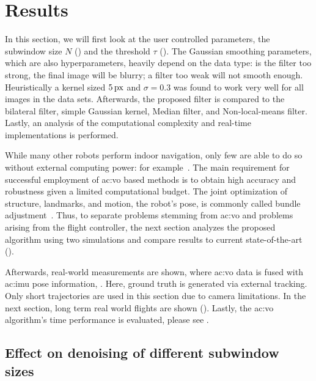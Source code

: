 \section{Results}
\label{perception_results}

In this section, we will first look at the user controlled parameters, the subwindow size $N$ () and the threshold $\tau$ ().
The Gaussian smoothing parameters, which are also hyperparameters, heavily depend on the data type: is the filter too strong, the final image will be blurry; a filter too weak will not smooth enough.
Heuristically a kernel sized $\unit[5]{px}$ and $\sigma = 0.3$ was found to work very well for all images in the data sets.
Afterwards, the proposed filter is compared to the bilateral filter, simple Gaussian kernel, Median filter, and Non-local-means filter. 
Lastly, an analysis of the computational complexity and real-time implementations is performed.

While many other robots perform indoor navigation, only few are able to do so without external computing power: for example~\cite{engel2012accurate, forster2014svo, kerl2013robust, forster2017svo}.
The main requirement for successful employment of \gls{ac:vo} based methods is to obtain high accuracy and robustness given a limited computational budget.
The joint optimization of structure, \ie landmarks, and motion, \ie the robot's pose, is commonly called bundle adjustment~\cite{triggs1999bundle, forster2017svo}.
Thus, to separate problems stemming from \gls{ac:vo} and problems arising from the flight controller, the next section analyzes the proposed algorithm using two simulations and compare results to current state-of-the-art ().

Afterwards, real-world measurements are shown, where \gls{ac:vo} data is fused with \gls{ac:imu} pose information, .
Here, ground truth is generated via external tracking.
Only short trajectories are used in this section due to camera limitations.
In the next section, long term real world flights are shown ().
Lastly, the \gls{ac:vo} algorithm's time performance is evaluated, please see .



\subsection{Effect on denoising of different subwindow sizes}
\label{ssec:perception_results_subwindowsize}

